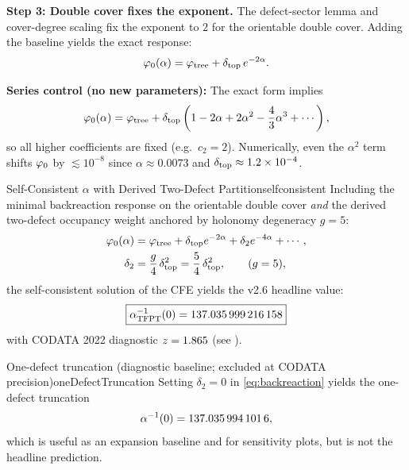 \textbf{Step 3: Double cover fixes the exponent.}
The defect-sector lemma and cover-degree scaling fix the exponent to $2$ for the
orientable double cover. Adding the baseline yields the exact response:
\begin{equation}
    \varphi_0(\alpha) = \varphi_{\mathrm{tree}} + \delta_{\mathrm{top}}\,e^{-2\alpha}.
\end{equation}

\begin{remark}
\textbf{Series control (no new parameters):} The exact form implies
\begin{equation}
    \varphi_0(\alpha)=\varphi_{\mathrm{tree}}+\delta_{\mathrm{top}}\left(1-2\alpha+2\alpha^2-\frac{4}{3}\alpha^3+\cdots\right),
\end{equation}
so all higher coefficients are fixed (e.g.\ $c_2=2$). Numerically, even the
$\alpha^2$ term shifts $\varphi_0$ by $\lesssim 10^{-8}$ since
$\alpha\approx 0.0073$ and $\delta_{\mathrm{top}}\approx 1.2\times10^{-4}$.
\end{remark}

\begin{theorem}{Self-Consistent $\alpha$ with Derived Two-Defect Partition}{selfconsistent}
Including the minimal backreaction response on the orientable double cover \emph{and} the derived two-defect occupancy weight anchored by holonomy degeneracy $g=5$:
\begin{align}
    \varphi_0(\alpha) &= \varphi_{\mathrm{tree}} + \delta_{\mathrm{top}} e^{-2\alpha} + \delta_2 e^{-4\alpha} + \cdots,
    \label{eq:backreaction}\\
    \delta_2 &= \frac{g}{4}\,\delta_{\mathrm{top}}^2 = \frac54\,\delta_{\mathrm{top}}^2,
    \qquad (g=5),
\end{align}
the self-consistent solution of the CFE yields the v2.6 headline value:
\begin{equation}
    \boxed{\alpha^{-1}_{\text{TFPT}}(0) = \num[round-mode=places,round-precision=12]{\TFPTalphaInvGOverFourNum}}
\end{equation}
with CODATA 2022 diagnostic $z=\num[round-mode=places,round-precision=3]{\TFPTalphaZGOverFourNum}$ (see ).
\end{theorem}

\begin{lemma}{One-defect truncation (diagnostic baseline; excluded at CODATA precision)}{oneDefectTruncation}
Setting $\delta_2=0$ in \eqref{eq:backreaction} yields the one-defect truncation
\[
\alpha^{-1}(0)=\num[round-mode=places,round-precision=10]{\TFPTalphaInvSelfNum},
\]
which is useful as an expansion baseline and for sensitivity plots, but is not the headline prediction.
\end{lemma}

